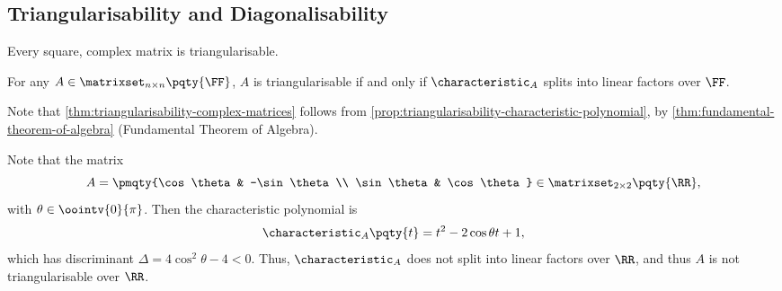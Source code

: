 \subsection{Triangularisability and Diagonalisability}

\begin{theorem}
    \label{thm:triangularisability-complex-matrices}%
    Every square, complex matrix is triangularisable.
\end{theorem}

\begin{proposition}
    \label{prop:triangularisability-characteristic-polynomial}%
    For any \(A \in \matrixset_{n \times n} \pqty{\FF}\), \(A\) is triangularisable if and only if \(\characteristic_{A}\) splits into linear factors over \(\FF\).
\end{proposition}

Note that \autoref{thm:triangularisability-complex-matrices} follows from \autoref{prop:triangularisability-characteristic-polynomial}, by \autoref{thm:fundamental-theorem-of-algebra} (Fundamental Theorem of Algebra).

\begin{example}
    Note that the matrix
    \[
        A = \pmqty{\cos \theta & -\sin \theta \\ \sin \theta & \cos \theta} \in \matrixset_{2 \times 2} \pqty{\RR},
    \]
    with \(\theta \in \oointv{0}{\pi}\). Then the characteristic polynomial is
    \[
        \characteristic_{A} \pqty{t} = t^2 - 2 \cos \theta t + 1,
    \]
    which has discriminant \(\Delta = 4 \cos^2 \theta - 4 < 0\). Thus, \(\characteristic_{A}\) does not split into linear factors over \(\RR\), and thus \(A\) is not triangularisable over \(\RR\).
\end{example}


